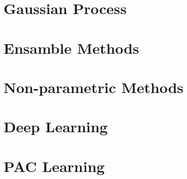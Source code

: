 \documentclass{note}
\begin{document}
	\newpage
	\chapter{Gaussian Process}
	
	
	\newpage
	\chapter{Ensamble Methods}
	
	
	\newpage
	\chapter{Non-parametric Methods}
	
	
	\newpage
	\chapter{Deep Learning}
	
	
	\newpage
	\chapter{PAC Learning}
	
%	
\end{document}
